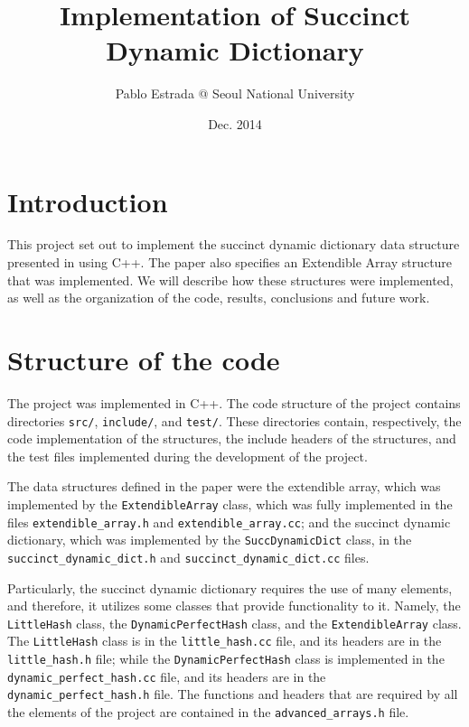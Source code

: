 \documentclass[10pt,a4paper]{article}
\title{Implementation of Succinct Dynamic Dictionary}
\author{Pablo Estrada @ Seoul National University}
\date{Dec. 2014}
\begin{document}

\maketitle


\section{Introduction}

This project set out to implement the succinct dynamic dictionary 
data structure presented in \cite{ramansatti2003} using C++. The paper also
specifies an Extendible Array structure that was implemented. We
will describe how these structures were implemented, as well as the
organization of the code, results, conclusions and future work.

\section{Structure of the code}

The project was implemented in C++. The code structure of the project contains 
directories \verb|src/|, \verb|include/|, and \verb|test/|. These directories 
contain, respectively, the code implementation of the structures, the
 include headers of the structures, and the test files implemented during the
 development of the project.

The data structures defined in the paper were the extendible array, which was implemented
 by the \verb|ExtendibleArray| class, which was fully implemented in the files 
\verb|extendible_array.h| and \verb|extendible_array.cc|; and the succinct 
dynamic dictionary, which was implemented by the \verb|SuccDynamicDict| class, 
in the \texttt{succinct\_dynamic\_dict.h} and \texttt{succinct\_dynamic\_dict.cc} files.

Particularly, the succinct dynamic dictionary requires the use of many elements,
and therefore, it utilizes some classes that provide functionality to it. Namely,
the \verb|LittleHash| class, the \verb|DynamicPerfectHash| class, and the 
\verb|ExtendibleArray| class. The \verb|LittleHash| class is in the
\texttt{little\_hash.cc} file, and its headers are in the \verb|little_hash.h| file;
while the \texttt{DynamicPerfectHash} class is implemented in the 
\texttt{dynamic\_perfect\_hash.cc} file, and its headers are in the 
\texttt{dynamic\_perfect\_hash.h} file. The functions and headers that are required by
all the elements of the project are contained in the \texttt{advanced\_arrays.h} file.
\end{document}

